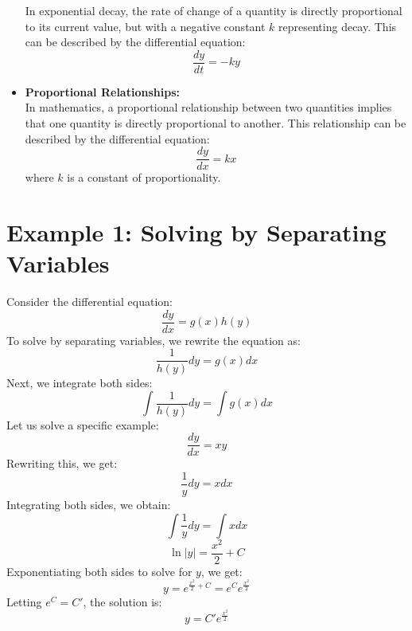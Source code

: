 \documentclass[a4paper,12pt]{article}
\begin{document}
\begin{itemize}
In exponential decay, the rate of change of a quantity is directly proportional to its current value, but with a negative constant \( k \) representing decay. This can be described by the differential equation:
\begin{equation}
    \frac{dy}{dt} = -ky
\end{equation}

\item \textbf{Proportional Relationships:}\\
In mathematics, a proportional relationship between two quantities implies that one quantity is directly proportional to another. This relationship can be described by the differential equation:
\begin{equation}
    \frac{dy}{dx} = kx
\end{equation}
where \( k \) is a constant of proportionality.

\end{itemize}

\section{Example 1: Solving by Separating Variables}
Consider the differential equation:
\begin{equation}
    \frac{dy}{dx} = g(x)h(y)
\end{equation}
To solve by separating variables, we rewrite the equation as:
\begin{equation}
    \frac{1}{h(y)} dy = g(x) dx
\end{equation}
Next, we integrate both sides:
\begin{equation}
    \int \frac{1}{h(y)} dy = \int g(x) dx
\end{equation}
Let us solve a specific example:
\begin{equation}
    \frac{dy}{dx} = xy
\end{equation}
Rewriting this, we get:
\begin{equation}
    \frac{1}{y} dy = x dx
\end{equation}
Integrating both sides, we obtain:
\begin{equation}
    \int \frac{1}{y} dy = \int x dx
\end{equation}
\begin{equation}
    \ln |y| = \frac{x^2}{2} + C
\end{equation}
Exponentiating both sides to solve for \( y \), we get:
\begin{equation}
    y = e^{\frac{x^2}{2} + C} = e^{C} e^{\frac{x^2}{2}}
\end{equation}
Letting \( e^{C} = C' \), the solution is:
\begin{equation}
    y = C' e^{\frac{x^2}{2}}
\end{equation}
\end{document}

